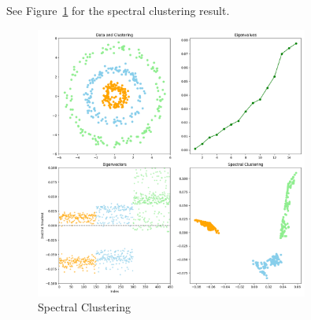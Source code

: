 \documentclass[11pt]{article}
\begin{document}
See Figure~\ref{fig:p4} for the spectral clustering result.
	
\begin{figure}[h]
	\centering
	\includegraphics[width=0.8\textwidth]{p4.png}
	\caption{Spectral Clustering}
	\label{fig:p4}
	\end{figure}

\newpage
\end{document}
